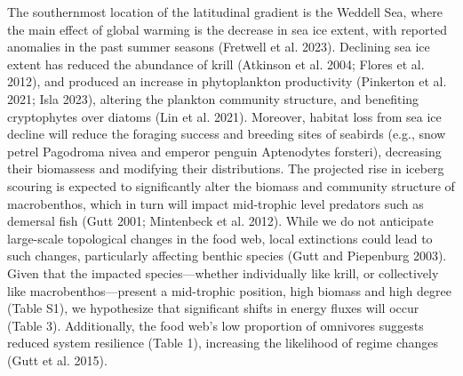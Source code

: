 \documentclass[
]{article}
\begin{document}
The southernmost location of the latitudinal gradient is the Weddell
Sea, where the main effect of global warming is the decrease in sea ice
extent, with reported anomalies in the past summer seasons (Fretwell et
al. 2023). Declining sea ice extent has reduced the abundance of krill
(Atkinson et al. 2004; Flores et al. 2012), and produced an increase in
phytoplankton productivity (Pinkerton et al. 2021; Isla 2023), altering
the plankton community structure, and benefiting cryptophytes over
diatoms (Lin et al. 2021). Moreover, habitat loss from sea ice decline
will reduce the foraging success and breeding sites of seabirds (e.g.,
snow petrel Pagodroma nivea and emperor penguin Aptenodytes forsteri),
decreasing their biomassess and modifying their distributions. The
projected rise in iceberg scouring is expected to significantly alter
the biomass and community structure of macrobenthos, which in turn will
impact mid-trophic level predators such as demersal fish (Gutt 2001;
Mintenbeck et al. 2012). While we do not anticipate large-scale
topological changes in the food web, local extinctions could lead to
such changes, particularly affecting benthic species (Gutt and
Piepenburg 2003). Given that the impacted species---whether individually
like krill, or collectively like macrobenthos---present a mid-trophic
position, high biomass and high degree (Table S1), we hypothesize that
significant shifts in energy fluxes will occur (Table 3). Additionally,
the food web's low proportion of omnivores suggests reduced system
resilience (Table 1), increasing the likelihood of regime changes (Gutt
et al. 2015).
\end{document}
